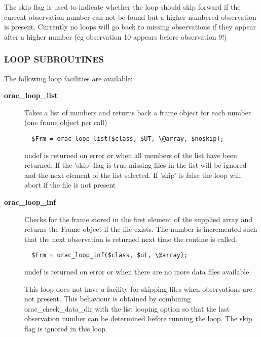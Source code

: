 \begin{description}
\begin{description}
The skip flag is used to indicate whether the loop should skip
forward if the current observation number can not be found
but a higher numbered observation is present. Currently no loops
will go back to missing observations if they appear after a higher
number (eg observation 10 appears before observation 9!)

\subsubsection*{LOOP SUBROUTINES\label{ORAC::Loop_LOOP_SUBROUTINES}}


The following loop facilities are available:

\begin{description}

\item[{\textbf{orac\_loop\_list}}] \mbox{}

Takes a list of numbers and returns back a frame object
for each number (one frame object per call)

\begin{verbatim}
  $Frm = orac_loop_list($class, $UT, \@array, $noskip);
\end{verbatim}


undef is returned on error or when all members of the
list have been returned. If the 'skip' flag is true
missing files in the list will be ignored and the next
element of the list selected. If 'skip' is false
the loop will abort if the file is not present


\item[{\textbf{orac\_loop\_inf}}] \mbox{}

Checks for the frame stored in the first element of the supplied array
and returns the Frame object if the file exists. The number is incremented
such that the next observation is returned next time the routine is
called.

\begin{verbatim}
  $Frm = orac_loop_inf($class, $ut, \@array);
\end{verbatim}


undef is returned on error or when there are no more data files
available.



This loop does not have a facility for skipping files when observations
are not present. This behaviour is obtained by combining
orac\_check\_data\_dir with the list looping option so that the last
observation number can be determined before running the loop. The skip
flag is ignored in this loop.



\end{description}
\end{description}
\end{description}
